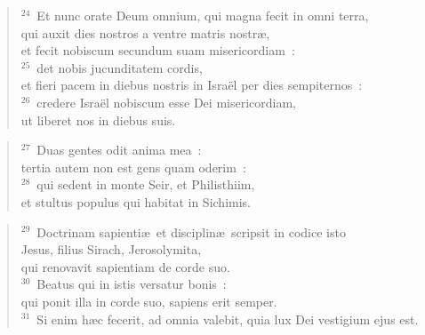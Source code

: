 \begin{flushleft}
\begin{verse}
${}^{24}$~Et nunc orate Deum omnium, qui magna fecit in omni terra,\\ qui auxit dies nostros a ventre matris nostr\ae ,\\ et fecit nobiscum secundum suam misericordiam~:\\
${}^{25}$~det nobis jucunditatem cordis,\\ et fieri pacem in diebus nostris in Isra\"el per dies sempiternos~:\\
${}^{26}$~credere Isra\"el nobiscum esse Dei misericordiam,\\ ut liberet nos in diebus suis.\end{verse}\end{flushleft}


\begin{flushleft}\begin{verse}${}^{27}$~Duas gentes odit anima mea~:\\ tertia autem non est gens quam oderim~:\\
${}^{28}$~qui sedent in monte Seir, et Philisthiim,\\ et stultus populus qui habitat in Sichimis.\end{verse}\end{flushleft}


\begin{flushleft}\begin{verse}${}^{29}$~Doctrinam sapienti\ae\ et disciplin\ae\ scripsit in codice isto\\ Jesus, filius Sirach, Jerosolymita,\\ qui renovavit sapientiam de corde suo.\\
${}^{30}$~Beatus qui in istis versatur bonis~:\\ qui ponit illa in corde suo, sapiens erit semper.\\
${}^{31}$~Si enim h\ae c fecerit, ad omnia valebit, quia lux Dei vestigium ejus est.\end{verse}\end{flushleft}


